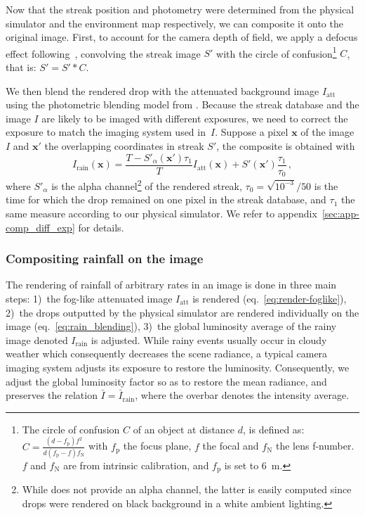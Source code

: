 Now that the streak position and photometry were determined from the physical simulator and the environment map respectively, we can composite it onto the original image. 
First, to account for the camera depth of field, we apply a defocus effect following~\cite{potmesil1981lens}, convolving the streak image $S'$ with the circle of confusion\footnote{The circle of confusion $C$ of an object at distance $d$, is defined as: $C = \frac{(d - f_{\text{p}}) f^2}{d(f_{\text{p}} - f) f_{\text{N}}}$ with $f_\text{p}$ the focus plane, $f$ the focal and $f_\text{N}$ the lens f-number. $f$ and $f_\text{N}$ are from intrinsic calibration, and $f_\text{p}$ is set to 6~m.} $C$, that is: $S' = S' * C$. 

We then blend the rendered drop with the attenuated background image $I_{\text{att}}$ using the photometric blending model from \cite{garg2007vision}. Because the streak database and the image $I$ are likely to be imaged with different exposures, we need to correct the exposure to match the imaging system used in~$I$.
Suppose a pixel $\mathbf{x}$ of the image $I$ and $\mathbf{x}'$ the overlapping coordinates in streak $S'$, the composite is obtained with
\begin{equation}
I_{\text{rain}}(\mathbf{x}) = \frac{T - S'_{\alpha}(\mathbf{x'})\tau_1}{T}I_{\text{att}}(\mathbf{x}) + S'(\mathbf{x'})\frac{\tau_1}{\tau_0}\,,
\label{eq:rain_blending}
\end{equation}
where $S'_{\alpha}$ is the alpha channel\footnote{While \cite{garg2006photorealistic} does not provide an alpha channel, the latter is easily computed since drops were rendered on black background in a white ambient lighting.} of the rendered streak, $\tau_0 = \sqrt{10^{-3}} / 50$ is the time for which the drop remained on one pixel in the streak database, and $\tau_1$ the same measure according to our physical simulator. We refer to appendix~\ref{sec:app-comp_diff_exp} for details.

\subsubsection{Compositing rainfall on the image}

The rendering of rainfall of arbitrary rates in an image is done in three main steps:
1)~the fog-like attenuated image $I_{\text{att}}$ is rendered (eq.~\ref{eq:render-foglike}), 
2)~the drops outputted by the physical simulator are rendered individually on the image (eq.~\ref{eq:rain_blending}),
3)~the global luminosity average of the rainy image denoted $I_{\text{rain}}$ is adjusted. 
While rainy events usually occur in cloudy weather which consequently decreases the scene radiance, a typical camera imaging system adjusts its exposure to restore the luminosity. Consequently, we adjust the global luminosity factor so as to restore the mean radiance, and preserves the relation $\bar{I} = \bar{I}_{\text{rain}}$, where the overbar denotes the intensity average.


